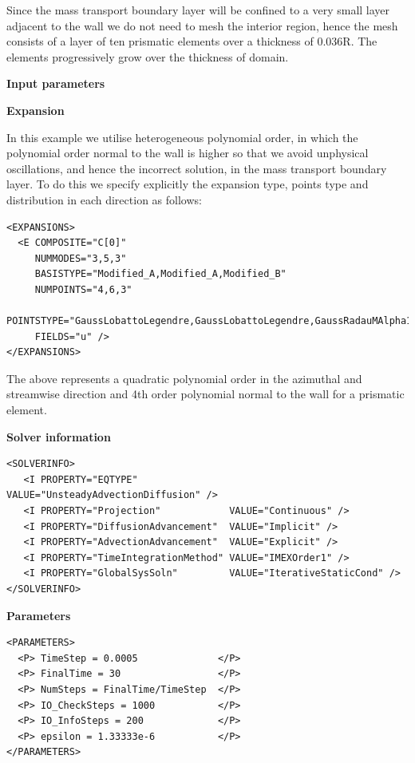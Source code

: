 Since the mass transport boundary layer will be confined to a very small layer adjacent to the wall we do not need to mesh
 the interior region, hence the mesh consists of a layer of ten prismatic elements over a thickness of 0.036R. 
The elements progressively grow over the thickness of domain.

\textbf{Input parameters}

\textbf{\footnotesize{Expansion}}

In this example we utilise heterogeneous polynomial order, in which the polynomial order normal to the wall is
 higher so that we avoid unphysical oscillations, and hence the incorrect solution, in the mass transport boundary layer.
  To do this we specify explicitly the expansion type, points type and distribution in each direction as follows:

\begin{lstlisting}[style=XMLStyle]
<EXPANSIONS>
  <E COMPOSITE="C[0]"
     NUMMODES="3,5,3"
     BASISTYPE="Modified_A,Modified_A,Modified_B"
     NUMPOINTS="4,6,3"
     POINTSTYPE="GaussLobattoLegendre,GaussLobattoLegendre,GaussRadauMAlpha1Beta0"
     FIELDS="u" />
</EXPANSIONS>
\end{lstlisting}

The above represents a quadratic polynomial order in the azimuthal and streamwise direction and 
4th order polynomial normal to the wall for a prismatic element.

\textbf{\footnotesize{Solver information}}

\begin{lstlisting}[style=XMLStyle]
<SOLVERINFO>
   <I PROPERTY="EQTYPE"                VALUE="UnsteadyAdvectionDiffusion" />
   <I PROPERTY="Projection"            VALUE="Continuous" />
   <I PROPERTY="DiffusionAdvancement"  VALUE="Implicit" />
   <I PROPERTY="AdvectionAdvancement"  VALUE="Explicit" />
   <I PROPERTY="TimeIntegrationMethod" VALUE="IMEXOrder1" />
   <I PROPERTY="GlobalSysSoln"         VALUE="IterativeStaticCond" />
</SOLVERINFO>
\end{lstlisting}

\textbf{\footnotesize{Parameters}}

\begin{lstlisting}[style=XMLStyle]
<PARAMETERS>
  <P> TimeStep = 0.0005              </P>
  <P> FinalTime = 30                 </P>
  <P> NumSteps = FinalTime/TimeStep  </P>
  <P> IO_CheckSteps = 1000           </P>
  <P> IO_InfoSteps = 200             </P>
  <P> epsilon = 1.33333e-6           </P>
</PARAMETERS>
\end{lstlisting}

